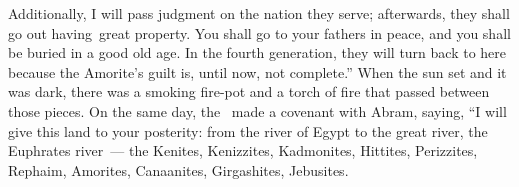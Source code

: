 \begin{inparaenum}
   Additionally, I will pass judgment on the nation they serve; afterwards, they shall go out having\understood{}\ great property.%
   You shall go to your fathers in peace, and you shall be buried in a good old age.%
   In the fourth generation, they will turn back to here because the Amorite's guilt is, until now, not complete.''%
   When the sun set and it was dark, there was a smoking fire-pot and a torch of fire that passed between those pieces.%
   On the same day, the \lord\ made a covenant with Abram, saying, ``I will give this land to your posterity: from the river of Egypt to the great river, the Euphrates river~---%
   the Kenites, Kenizzites, Kadmonites,%
   Hittites, Perizzites, Rephaim,%
   Amorites, Canaanites, Girgashites, Jebusites.%
\end{inparaenum}
